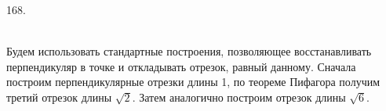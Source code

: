168. \begin{figure}[ht!]
\end{figure}\\
Будем использовать стандартные построения, позволяющее восстанавливать перпендикуляр в точке и откладывать отрезок, равный данному. Сначала построим перпендикулярные отрезки длины 1, по теореме Пифагора получим третий отрезок длины $\sqrt{2}.$ Затем аналогично построим отрезок длины $\sqrt{6}.$\\
